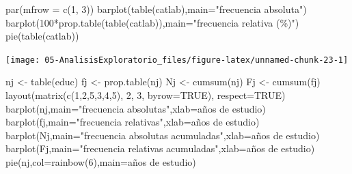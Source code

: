 \documentclass[
]{book}
\newenvironment{Shaded}{\begin{snugshade}}{\end{snugshade}}
\newcommand{\AttributeTok}[1]{\textcolor[rgb]{0.77,0.63,0.00}{#1}}
\newcommand{\ConstantTok}[1]{\textcolor[rgb]{0.00,0.00,0.00}{#1}}
\newcommand{\DecValTok}[1]{\textcolor[rgb]{0.00,0.00,0.81}{#1}}
\newcommand{\FunctionTok}[1]{\textcolor[rgb]{0.00,0.00,0.00}{#1}}
\newcommand{\NormalTok}[1]{#1}
\newcommand{\OtherTok}[1]{\textcolor[rgb]{0.56,0.35,0.01}{#1}}
\newcommand{\SpecialCharTok}[1]{\textcolor[rgb]{0.00,0.00,0.00}{#1}}
\newcommand{\StringTok}[1]{\textcolor[rgb]{0.31,0.60,0.02}{#1}}
\theoremstyle{break}
\begin{document}
\begin{Shaded}
\begin{Highlighting}[]
\FunctionTok{par}\NormalTok{(}\AttributeTok{mfrow =} \FunctionTok{c}\NormalTok{(}\DecValTok{1}\NormalTok{, }\DecValTok{3}\NormalTok{))}
\FunctionTok{barplot}\NormalTok{(}\FunctionTok{table}\NormalTok{(catlab),}\AttributeTok{main=}\StringTok{"frecuencia absoluta"}\NormalTok{)}
\FunctionTok{barplot}\NormalTok{(}\DecValTok{100}\SpecialCharTok{*}\FunctionTok{prop.table}\NormalTok{(}\FunctionTok{table}\NormalTok{(catlab)),}\AttributeTok{main=}\StringTok{"frecuencia relativa (\%)"}\NormalTok{)}
\FunctionTok{pie}\NormalTok{(}\FunctionTok{table}\NormalTok{(catlab))}
\end{Highlighting}
\end{Shaded}

\begin{center}\texttt{[image: 05-AnalisisExploratorio\_files/figure-latex/unnamed-chunk-23-1]} \end{center}

\begin{Shaded}
\begin{Highlighting}[]
\NormalTok{nj }\OtherTok{\textless{}{-}} \FunctionTok{table}\NormalTok{(educ)}
\NormalTok{fj }\OtherTok{\textless{}{-}} \FunctionTok{prop.table}\NormalTok{(nj)}
\NormalTok{Nj }\OtherTok{\textless{}{-}} \FunctionTok{cumsum}\NormalTok{(nj)}
\NormalTok{Fj }\OtherTok{\textless{}{-}} \FunctionTok{cumsum}\NormalTok{(fj)}
\FunctionTok{layout}\NormalTok{(}\FunctionTok{matrix}\NormalTok{(}\FunctionTok{c}\NormalTok{(}\DecValTok{1}\NormalTok{,}\DecValTok{2}\NormalTok{,}\DecValTok{5}\NormalTok{,}\DecValTok{3}\NormalTok{,}\DecValTok{4}\NormalTok{,}\DecValTok{5}\NormalTok{), }\DecValTok{2}\NormalTok{, }\DecValTok{3}\NormalTok{, }\AttributeTok{byrow=}\ConstantTok{TRUE}\NormalTok{), }\AttributeTok{respect=}\ConstantTok{TRUE}\NormalTok{)}
\FunctionTok{barplot}\NormalTok{(nj,}\AttributeTok{main=}\StringTok{"frecuencia absolutas"}\NormalTok{,}\AttributeTok{xlab=}\StringTok{\textquotesingle{}años de estudio\textquotesingle{}}\NormalTok{)}
\FunctionTok{barplot}\NormalTok{(fj,}\AttributeTok{main=}\StringTok{"frecuencia relativas"}\NormalTok{,}\AttributeTok{xlab=}\StringTok{\textquotesingle{}años de estudio\textquotesingle{}}\NormalTok{)}
\FunctionTok{barplot}\NormalTok{(Nj,}\AttributeTok{main=}\StringTok{"frecuencia absolutas acumuladas"}\NormalTok{,}\AttributeTok{xlab=}\StringTok{\textquotesingle{}años de estudio\textquotesingle{}}\NormalTok{)}
\FunctionTok{barplot}\NormalTok{(Fj,}\AttributeTok{main=}\StringTok{"frecuencia relativas acumuladas"}\NormalTok{,}\AttributeTok{xlab=}\StringTok{\textquotesingle{}años de estudio\textquotesingle{}}\NormalTok{)}
\FunctionTok{pie}\NormalTok{(nj,}\AttributeTok{col=}\FunctionTok{rainbow}\NormalTok{(}\DecValTok{6}\NormalTok{),}\AttributeTok{main=}\StringTok{\textquotesingle{}años de estudio\textquotesingle{}}\NormalTok{)}
\end{Highlighting}
\end{Shaded}
\end{document}
